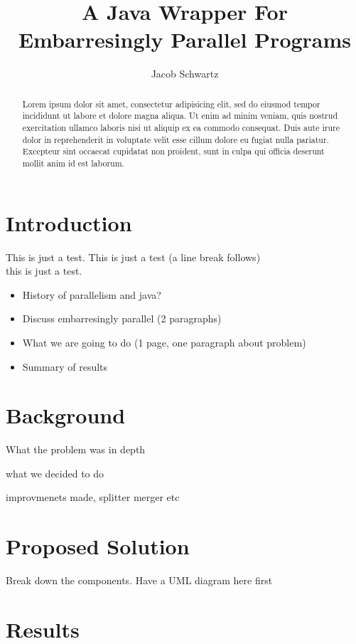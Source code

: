 \documentclass[12pt]{article}
\begin{document}
\title{A Java Wrapper For Embarresingly Parallel Programs}
\author{Jacob Schwartz}
\maketitle

\begin{abstract}
Lorem ipsum dolor sit amet, consectetur adipisicing elit, sed do eiusmod
tempor incididunt ut labore et dolore magna aliqua. Ut enim ad minim
veniam, quis nostrud exercitation ullamco laboris nisi ut aliquip ex ea
commodo consequat. Duis aute irure dolor in reprehenderit in voluptate
velit esse cillum dolore eu fugiat nulla pariatur. Excepteur sint occaecat
cupidatat non proident, sunt in culpa qui officia deserunt mollit anim
id est laborum.
\end{abstract}


\section{Introduction}

This is just a test. This is just a test (a line break follows)\\
this is just a test.

\begin{itemize}
\item History of parallelism and java?
\item Discuss embarresingly parallel (2 paragraphs)
\item What we are going to do (1 page, one paragraph about problem)
\item Summary of results
\end{itemize}

\section{Background}

What the problem was in depth

what we decided to do

improvmenets made, splitter merger etc

\section{Proposed Solution}

Break down the components. Have a UML diagram here first

\section{Results}
\end{document}
